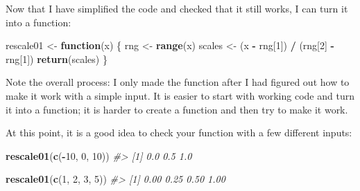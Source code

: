 \documentclass[]{book}
\newenvironment{Shaded}{\begin{snugshade}}{\end{snugshade}}
\newcommand{\KeywordTok}[1]{\textcolor[rgb]{0.13,0.29,0.53}{\textbf{#1}}}
\newcommand{\DecValTok}[1]{\textcolor[rgb]{0.00,0.00,0.81}{#1}}
\newcommand{\StringTok}[1]{\textcolor[rgb]{0.31,0.60,0.02}{#1}}
\newcommand{\CommentTok}[1]{\textcolor[rgb]{0.56,0.35,0.01}{\textit{#1}}}
\newcommand{\ControlFlowTok}[1]{\textcolor[rgb]{0.13,0.29,0.53}{\textbf{#1}}}
\newcommand{\OperatorTok}[1]{\textcolor[rgb]{0.81,0.36,0.00}{\textbf{#1}}}
\newcommand{\NormalTok}[1]{#1}
\begin{document}
\begin{Shaded}
\end{Shaded}

Now that I have simplified the code and checked that it still works, I
can turn it into a function:

\begin{Shaded}
\begin{Highlighting}[]
\NormalTok{rescale01 <-}\StringTok{ }\ControlFlowTok{function}\NormalTok{(x) \{}
\NormalTok{  rng <-}\StringTok{ }\KeywordTok{range}\NormalTok{(x)}
\NormalTok{  scales <-}\StringTok{ }\NormalTok{(x }\OperatorTok{-}\StringTok{ }\NormalTok{rng[}\DecValTok{1}\NormalTok{]) }\OperatorTok{/}\StringTok{ }\NormalTok{(rng[}\DecValTok{2}\NormalTok{] }\OperatorTok{-}\StringTok{ }\NormalTok{rng[}\DecValTok{1}\NormalTok{])}
  \KeywordTok{return}\NormalTok{(scales)}
\NormalTok{\}}
\end{Highlighting}
\end{Shaded}

Note the overall process: I only made the function after I had figured
out how to make it work with a simple input. It is easier to start with
working code and turn it into a function; it is harder to create a
function and then try to make it work.

At this point, it is a good idea to check your function with a few
different inputs:

\begin{Shaded}
\begin{Highlighting}[]
\KeywordTok{rescale01}\NormalTok{(}\KeywordTok{c}\NormalTok{(}\OperatorTok{-}\DecValTok{10}\NormalTok{, }\DecValTok{0}\NormalTok{, }\DecValTok{10}\NormalTok{))}
\CommentTok{#> [1] 0.0 0.5 1.0}

\KeywordTok{rescale01}\NormalTok{(}\KeywordTok{c}\NormalTok{(}\DecValTok{1}\NormalTok{, }\DecValTok{2}\NormalTok{, }\DecValTok{3}\NormalTok{, }\DecValTok{5}\NormalTok{))}
\CommentTok{#> [1] 0.00 0.25 0.50 1.00}
\end{Highlighting}
\end{Shaded}
\end{document}
